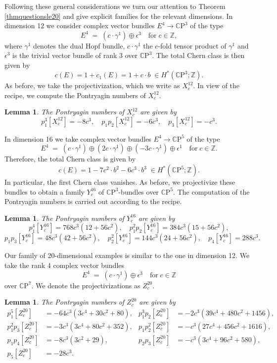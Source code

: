 \documentclass[10pt,a4paper]{amsart}
\theoremstyle{thm}
\newtheorem{lem}[thm]{Lemma}
\theoremstyle{text}
\begin{document}
Following these general considerations we turn our attention to Theorem \ref{thmquestionsle20} and give explicit families for the relevant dimensions. In dimension 12 we consider complex vector bundles $E^4 \rightarrow {\mathbb{C}\mathrm{P}}^3$ of the type 
\[ E^4 \; = \; (c \cdot \gamma^1) \oplus \epsilon^3 \quad \textrm{for} \; c \in {\mathbb{Z}},\]
where $\gamma^1$ denotes the dual Hopf bundle, $c\cdot \gamma^1$ the $c$-fold tensor product of $ \gamma^1$ and $\epsilon^3$  is the trivial vector bundle of rank 3 over ${\mathbb{C}\mathrm{P}}^3$. The total Chern class is then given by
\[ c(E) = 1+ c_1(E) = 1+ c \cdot b \; \in H^{\ast}({\mathbb{C}\mathrm{P}}^{3}; {\mathbb{Z}}).\]
As before, we take the projectivization, which we write as $X^{12}_c$. In view of the recipe, we compute the Pontryagin numbers of $X^{12}_c$. 
\begin{lem}\label{lemdimtwelve}
The Pontryagin numbers of $X^{12}_c$ are given by
\[ p_1^3[X^{12}_c] = -8c^3, \quad p_1p_2[X^{12}_c] = -6c^3, \quad p_3[X^{12}_c] = -c^3.\]
\end{lem}

In dimension 16 we take complex vector bundles $E^4 \rightarrow {\mathbb{C}\mathrm{P}}^5$ of the type
\[ E^4 \; = \; (c \cdot \gamma^1) \oplus (2c \cdot \gamma^1) \oplus (-3c \cdot \gamma^1) \oplus \epsilon^1 \quad \textrm{for} \; c \in {\mathbb{Z}}.\]
Therefore, the total Chern class is given by
\[ c(E) = 1-7 c^2 \cdot b^2-6 c^3 \cdot b^3 \; \in H^{\ast}({\mathbb{C}\mathrm{P}}^5; {\mathbb{Z}}).\]
In particular, the first Chern class vanishes. As before, we projectivize these bundles to obtain a family $Y_c^{16}$ of ${\mathbb{C}\mathrm{P}}^3$-bundles over ${\mathbb{C}\mathrm{P}}^5$. The computation of the Pontryagin numbers is carried out according to the recipe.

\begin{lem}\label{lemdimsixteen}
The Pontryagin numbers of $Y^{16}_c$ are given by
\[p_1^4[Y^{16}_c] = 768 c^3(12+56c^2), \quad p_1^2p_2[Y^{16}_c]=384c^3(15+56c^2),\]
\[p_1p_3[Y^{16}_c] = 48c^3(42+56c^2), \quad p_2^2[Y^{16}_c]=144 c^3(24+56c^2), \quad p_4[Y^{16}_c]=288c^3.\]
\end{lem}

Our family of 20-dimensional examples is similar to the one in dimension 12. We take the rank 4 complex vector bundles
\[ E^4 \; = \; (c \cdot \gamma^1) \oplus \epsilon^3 \quad \textrm{for} \; c \in {\mathbb{Z}}\]
over ${\mathbb{C}\mathrm{P}}^7$. We denote the projectivizations as $Z^{20}_c$.
\begin{lem}\label{lemdim20}
The Pontryagin numbers of $Z^{20}_c$ are given by
\begin{align*} 
p_1^5[Z^{20}_c] &=-64 c^3 (3 c^4+30 c^2+80), & p_1^3p_2[Z^{20}_c]&=-2 c^3 (39 c^4+480 c^2+1456), \\
p_1^2p_3[Z^{20}_c]&=-3 c^3 (3 c^4+80 c^2+352), &p_1p_2^2[Z^{20}_c]&=-c^3 (27 c^4+456 c^2+1616), \\
 p_1p_4[Z^{20}_c]&=-8 c^3 (3 c^2+29),  & p_2p_3[Z^{20}_c]&=-c^3 (3 c^4+96 c^2+580),\\
p_5[Z^{20}_c]&=-28 c^3.&& \end{align*}
\end{lem}
\end{document}
